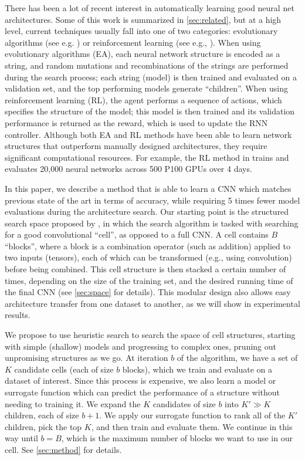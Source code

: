 \documentclass[runningheads]{llncs}
\begin{document}
There has been a lot of recent interest in automatically learning good neural net architectures.
Some of this work is summarized in \cref{sec:related}, but at a high level,
current techniques
usually fall into one of two categories: evolutionary algorithms 
(see e.g. \cite{DBLP:conf/icml/RealMSSSTLK17,Miikkulainen2017,DBLP:journals/corr/XieY17})
or reinforcement learning
(see e.g., \cite{DBLP:journals/corr/ZophL16,DBLP:journals/corr/ZophVSL17,Zhong2018,Cai2017,DBLP:journals/corr/BakerGNR16}).
When using evolutionary algorithms (EA), each neural network structure is encoded as a string, and random mutations and recombinations of the strings are performed during the search process;
each string (model) is then trained and evaluated on a validation set,
and the top performing models generate  ``children''.
When using reinforcement learning (RL),  the agent performs a sequence of actions, which specifies the structure of the model; this model is then trained and its validation performance is returned as the reward, which is used to update the RNN controller.
Although both EA and RL methods have been able to learn network structures that outperform manually designed architectures, they require significant computational resources.
For example, the RL method in
\cite{DBLP:journals/corr/ZophVSL17} 
trains and evaluates 20,000 neural networks across 500 P100 GPUs over 4 days.


In this paper, we describe a method that is able to learn a CNN which matches previous state of the art in terms of accuracy,
while requiring 5 times fewer model evaluations during the architecture search.
Our starting point is the structured search space
proposed by \cite{DBLP:journals/corr/ZophVSL17}, in which the search algorithm is tasked with searching for a good convolutional ``cell'', as opposed to a full CNN.
A cell contains $B$ ``blocks'', where a block is a combination operator (such as addition) applied to two inputs (tensors), each of which can be transformed (e.g., using convolution) before being combined.
This cell structure is then stacked a certain number of times, depending on the size of the training set, and the desired running time of the final CNN
(see \cref{sec:space} for details).
This modular design also allows easy architecture transfer from one dataset to another,
as we will show in experimental results.

We propose to use  heuristic search to search the space of cell structures,
starting with simple (shallow) models and progressing to complex ones, pruning out unpromising structures as we go.
At iteration $b$ of the algorithm, we have a set of $K$ candidate cells (each of size $b$ blocks), which we train and evaluate on a dataset of interest. Since this process is expensive,
we also learn a model or surrogate function which can predict the performance of a structure
without needing to training it.
We expand the $K$ candidates of size $b$ into $K' \gg K$ children, each of size $b+1$.
We apply our surrogate function to rank all of the $K'$ children,
pick the top $K$, and then train and evaluate them.
We continue in this way until $b=B$, which is the maximum number of blocks we want to use in our cell.
See \cref{sec:method} for details.
\end{document}
